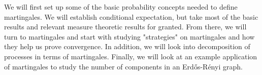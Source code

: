\summary

We will first set up some of the basic probability concepts needed to define martingales. We will establish conditional expectation, but take most of the basic results and relevant measure theoretic results for granted. From there, we will turn to martingales and start with studying "strategies" on martingales and how they help us prove convergence. In addition, we will look into decomposition of processes in terms of martingales. Finally, we will look at an example application of martingales to study the number of components in an Erdős-Rényi graph.
